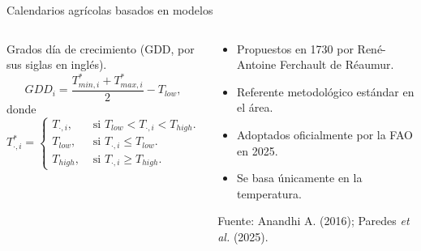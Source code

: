 \documentclass[aspectratio=169]{beamer}
\begin{document}
\begin{frame}{Calendarios agrícolas basados en modelos}
	\begin{columns}
		\vspace*{-1cm}
		Grados día de crecimiento (GDD, por sus siglas en inglés).
		\[GDD_i= \frac{T^*_{min,i} + T^*_{max,i}}{2} - T_{low},\]
		donde \[T^*_{\cdot, i}= \begin{cases}
			T_{\cdot, i},& \text{ si } T_{low} <T_{\cdot, i}< T_{high}.\\
			T_{low},& \text{ si } T_{\cdot, i} \leq T_{low}.\\
			T_{high},& \text{ si } T_{\cdot, i} \geq T_{high}.
		\end{cases}\]
		
		\begin{block}{}
			\begin{itemize}
				\item Propuestos en 1730 por René-Antoine Ferchault de Réaumur.
				\item Referente metodológico estándar en el área.
				\item Adoptados oficialmente por la FAO en 2025.
				\item Se basa únicamente en la temperatura.
			\end{itemize}
			{\tiny Fuente: Anandhi A. (2016); Paredes \textit{et al.} (2025).}
		\end{block}
	\end{columns}
\end{frame}
\end{document}
